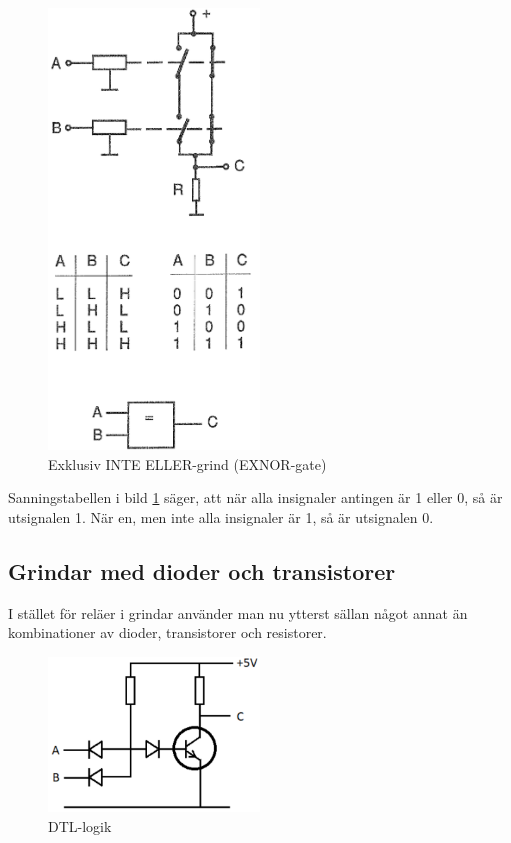 \begin{figure}
\includegraphics[width=0.5\textwidth]{images/cropped_pdfs/bild_2_2-43.pdf}
\caption{Exklusiv INTE ELLER-grind (EXNOR-gate)}
\label{fig:BildII2-43}
\end{figure}

Sanningstabellen i bild \ref{fig:BildII2-43} säger, att när alla insignaler
antingen är 1 eller 0, så är utsignalen 1.
När en, men inte alla insignaler är 1, så är utsignalen 0.

\subsection{Grindar med dioder och transistorer}

I stället för reläer i grindar använder man nu ytterst sällan något annat än
kombinationer av dioder, transistorer och resistorer.

\begin{figure}
\includegraphics[width=0.5\textwidth]{images/cropped_pdfs/bild_2_2-44.pdf}
\caption{DTL-logik}
\label{fig:BildII2-44}
\end{figure}

